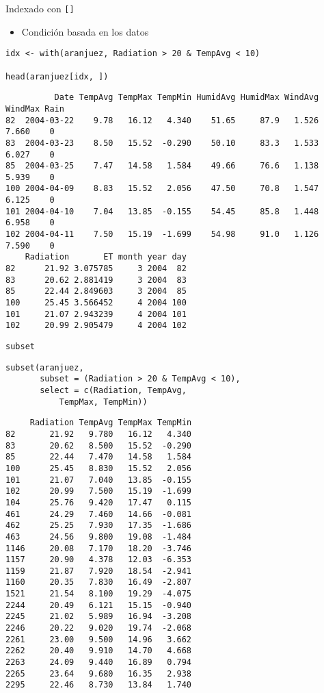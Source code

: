 \documentclass[xcolor={usenames,svgnames,dvipsnames}]{beamer}
\begin{document}
\begin{frame}[label={sec:org6b6998b},fragile]{Indexado con \texttt{[]}}
 \begin{itemize}
\item Condición basada en los datos
\end{itemize}
\lstset{language=r,label= ,caption= ,captionpos=b,numbers=none}
\begin{lstlisting}
idx <- with(aranjuez, Radiation > 20 & TempAvg < 10) 

head(aranjuez[idx, ])
\end{lstlisting}

\begin{verbatim}
          Date TempAvg TempMax TempMin HumidAvg HumidMax WindAvg WindMax Rain
82  2004-03-22    9.78   16.12   4.340    51.65     87.9   1.526   7.660    0
83  2004-03-23    8.50   15.52  -0.290    50.10     83.3   1.533   6.027    0
85  2004-03-25    7.47   14.58   1.584    49.66     76.6   1.138   5.939    0
100 2004-04-09    8.83   15.52   2.056    47.50     70.8   1.547   6.125    0
101 2004-04-10    7.04   13.85  -0.155    54.45     85.8   1.448   6.958    0
102 2004-04-11    7.50   15.19  -1.699    54.98     91.0   1.126   7.590    0
    Radiation       ET month year day
82      21.92 3.075785     3 2004  82
83      20.62 2.881419     3 2004  83
85      22.44 2.849603     3 2004  85
100     25.45 3.566452     4 2004 100
101     21.07 2.943239     4 2004 101
102     20.99 2.905479     4 2004 102
\end{verbatim}
\end{frame}

\begin{frame}[label={sec:org1baaee1},fragile]{\texttt{subset}}
 \lstset{language=r,label= ,caption= ,captionpos=b,numbers=none}
\begin{lstlisting}
subset(aranjuez,
       subset = (Radiation > 20 & TempAvg < 10),
       select = c(Radiation, TempAvg,
           TempMax, TempMin))
\end{lstlisting}

\begin{verbatim}
     Radiation TempAvg TempMax TempMin
82       21.92   9.780   16.12   4.340
83       20.62   8.500   15.52  -0.290
85       22.44   7.470   14.58   1.584
100      25.45   8.830   15.52   2.056
101      21.07   7.040   13.85  -0.155
102      20.99   7.500   15.19  -1.699
104      25.76   9.420   17.47   0.115
461      24.29   7.460   14.66  -0.081
462      25.25   7.930   17.35  -1.686
463      24.56   9.800   19.08  -1.484
1146     20.08   7.170   18.20  -3.746
1157     20.90   4.378   12.03  -6.353
1159     21.87   7.920   18.54  -2.941
1160     20.35   7.830   16.49  -2.807
1521     21.54   8.100   19.29  -4.075
2244     20.49   6.121   15.15  -0.940
2245     21.02   5.989   16.94  -3.208
2246     20.22   9.020   19.74  -2.068
2261     23.00   9.500   14.96   3.662
2262     20.40   9.910   14.70   4.668
2263     24.09   9.440   16.89   0.794
2265     23.64   9.680   16.35   2.938
2295     22.46   8.730   13.84   1.740
\end{verbatim}
\end{frame}
\end{document}
